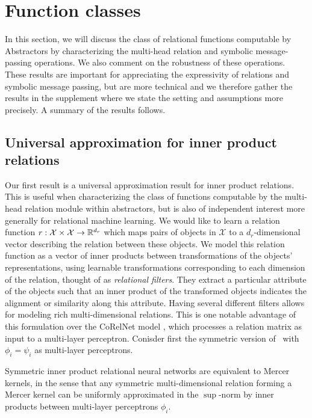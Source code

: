 \section{Function classes}\label{ssec:function_classes_preview}

In this section, we will discuss the class of relational functions computable by Abstractors by characterizing the multi-head relation and symbolic message-passing operations. We also comment on the robustness of these operations. These results are important for appreciating the expressivity of relations and symbolic message passing, but are more technical and we therefore gather the results in the supplement where we state the setting and assumptions more precisely. A summary of the results follows.

\def\rdot{\bigcdot}
\def\F{{\mathfrak{F}}}
\def\MLP{\text{MLP}}

\subsection{Universal approximation for inner product relations}

Our first result is a universal approximation result for inner product relations. This is useful when characterizing the class of functions computable by the multi-head relation module within abstractors, but is also of independent interest more generally for relational machine learning.
We would like to learn a relation function \(r: \mathcal{X} \times \mathcal{X} \to \mathbb{R}^{d_r}\) which maps pairs of objects in \(\mathcal{X}\) to a \(d_r\)-dimensional vector describing the relation between these objects. We model this relation function as a vector of inner products between transformations of the objects' representations,
using learnable transformations corresponding to each dimension of the relation, thought of as \textit{relational filters}. They extract a particular attribute of the objects such that an inner product of the transformed objects indicates the alignment or similarity along this attribute. Having several different filters allows for modeling rich multi-dimensional relations. This is one notable advantage of this formulation over the CoRelNet model \citep{kerg2022neural}, which processes a relation matrix as input to a multi-layer perceptron. Conisder first the symmetric version of~ with $\phi_i = \psi_i$ as multi-layer perceptrons.

\begin{result}
    Symmetric inner product relational neural networks are equivalent to Mercer kernels, in the sense that any symmetric multi-dimensional relation forming a Mercer kernel can be uniformly approximated in the $\sup$-norm by inner products between multi-layer perceptrons $\phi_i$.
\end{result}

